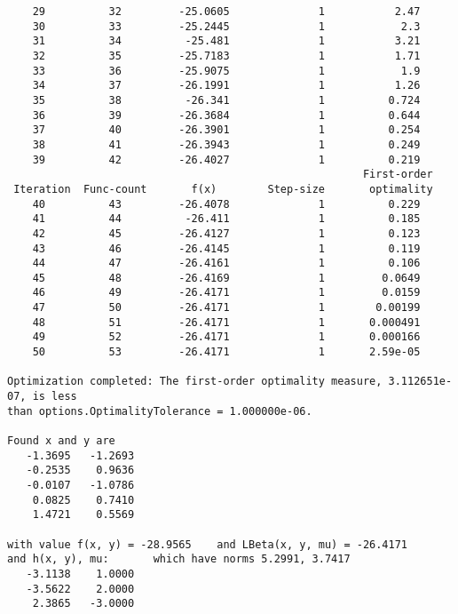 \documentclass{article}
\begin{document}
\begin{lstlisting}
    29          32         -25.0605              1           2.47  
    30          33         -25.2445              1            2.3  
    31          34          -25.481              1           3.21  
    32          35         -25.7183              1           1.71  
    33          36         -25.9075              1            1.9  
    34          37         -26.1991              1           1.26  
    35          38          -26.341              1          0.724  
    36          39         -26.3684              1          0.644  
    37          40         -26.3901              1          0.254  
    38          41         -26.3943              1          0.249  
    39          42         -26.4027              1          0.219  
                                                        First-order 
 Iteration  Func-count       f(x)        Step-size       optimality
    40          43         -26.4078              1          0.229  
    41          44          -26.411              1          0.185  
    42          45         -26.4127              1          0.123  
    43          46         -26.4145              1          0.119  
    44          47         -26.4161              1          0.106  
    45          48         -26.4169              1         0.0649  
    46          49         -26.4171              1         0.0159  
    47          50         -26.4171              1        0.00199  
    48          51         -26.4171              1       0.000491  
    49          52         -26.4171              1       0.000166  
    50          53         -26.4171              1       2.59e-05  

Optimization completed: The first-order optimality measure, 3.112651e-07, is less 
than options.OptimalityTolerance = 1.000000e-06.

Found x and y are
   -1.3695   -1.2693
   -0.2535    0.9636
   -0.0107   -1.0786
    0.0825    0.7410
    1.4721    0.5569

with value f(x, y) = -28.9565    and LBeta(x, y, mu) = -26.4171
and h(x, y), mu:       which have norms 5.2991, 3.7417
   -3.1138    1.0000
   -3.5622    2.0000
    2.3865   -3.0000
\end{lstlisting}
\end{document}
